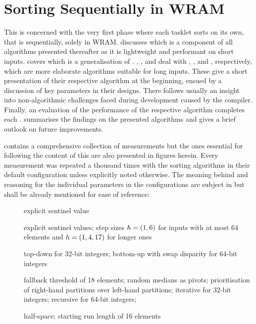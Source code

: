 \chapter{Sorting Sequentially in WRAM}
\label{sec:tasklet}

This  is concerned with the very first phase where each tasklet sorts on its own, that is sequentially, solely in WRAM.
 discusses \IS{} which is a component of all algorithms presented thereafter as it is lightweight and performant on short inputs.
 covers \ShS{} which is a generalisation of \IS{}.
\hyperref[sec:tasklet:heap]{ }, , and  deal with \HS{}, \QS{}, and \MS{}, respectively, which are more elaborate algorithms suitable for long inputs.
These  give a short presentation of their respective algorithm at the beginning, ensued by a discussion of key parameters in their designs.
There follows usually an insight into non-algorithmic challenges faced during development caused by the compiler.
Finally, an evaluation of the performance of the respective algorithm completes each .
 summarises the findings on the presented algorithms and gives a brief outlook on future improvements.

 contains a comprehensive collection of measurements but the ones essential for following the content of this  are also presented in figures herein.
Every measurement was repeated a thousand times with the sorting algorithms in their default configuration unless explicitly noted otherwise.
The meaning behind and reasoning for the individual parameters in the configurations are subject in  but shall be already mentioned for ease of reference:
\begin{description}
	\item[\IS{}]
	explicit sentinel value

	\item[\ShS{}]
	explicit sentinel values;
	step sizes \(h = (1, 6)\) for inputs with at most 64 elements and \(h = (1, 4, 17)\) for longer ones

	\item[\HS{}]
	top-down for 32-bit integers;
	bottom-up with swap disparity for 64-bit integers

	\item[\QS{}]
	fallback threshold of 18 elements;
	random medians as pivots;
	prioritisation of right-hand partitions over left-hand partitions;
	iterative for 32-bit integers;
	recursive for 64-bit integers;

	\item[\MS{}]
	half-space;
	starting run length of 16 elements
\end{description}

